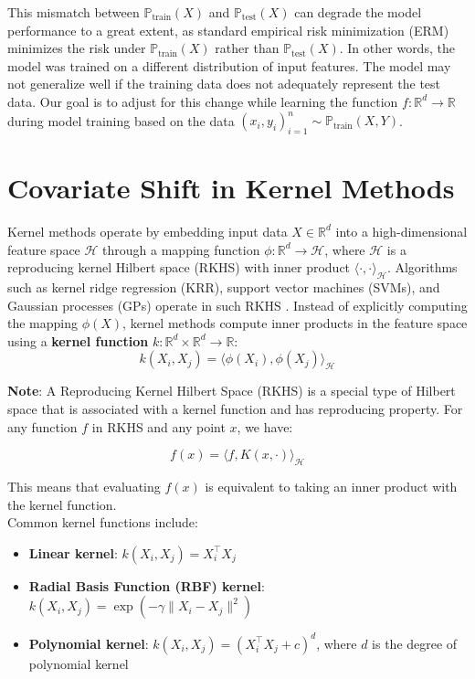 This mismatch between $\mathbb{P}_{\text{train}} (X)$ and $\mathbb{P}_{\text{test}} (X)$ can degrade the model performance to a great extent, as standard empirical risk minimization (ERM) minimizes the risk under $\mathbb{P}_{\text{train}} (X)$ rather than $\mathbb{P}_{\text{test}} (X)$. In other words, the model was trained on a different distribution of input features. The model may not generalize well if the training data does not adequately represent the test data. Our goal is to adjust for this change while learning the function $f: \mathbb{R}^d \rightarrow \mathbb{R}$ during model training based on the data ${(x_i, y_i)}_{i=1}^{n} \sim \mathbb{P}_{\text{train}}(X, Y)$.

\section{Covariate Shift in Kernel Methods}\label{kernel}

Kernel methods operate by embedding input data $X \in \mathbb{R}^d$ into a high-dimensional feature space $\mathcal{H}$ through a mapping function $\phi: \mathbb{R}^d \to \mathcal{H}$, where $\mathcal{H}$ is a reproducing kernel Hilbert space (RKHS) with inner product $\langle \cdot, \cdot \rangle_{\mathcal{H}}$. Algorithms such as kernel ridge regression (KRR), support vector machines (SVMs), and Gaussian processes (GPs) operate in such RKHS \citep{scholkopf2002learning}. Instead of explicitly computing the mapping $\phi(X)$, kernel methods compute inner products in the feature space using a \textbf{kernel function} $k: \mathbb{R}^d \times \mathbb{R}^d \to \mathbb{R}$:
$$k(X_i, X_j) = \langle \phi(X_i), \phi(X_j) \rangle_{\mathcal{H}}$$

\textbf{Note}: A Reproducing Kernel Hilbert Space (RKHS) is a special type of Hilbert space that is associated with a kernel function and has reproducing property. For any function $f$ in RKHS and any point $x$, we have:

$$f(x) = \langle f, K(x, \cdot) \rangle_{\mathcal{H}}$$

This means that evaluating $f(x)$ is equivalent to taking an inner product with the kernel function.\\

Common kernel functions include:
\begin{itemize}
    \item \textbf{Linear kernel}: $k(X_i, X_j) = X_i^\top X_j$
    \item \textbf{Radial Basis Function (RBF) kernel}: $k(X_i, X_j) = \exp (-\gamma \lVert X_i - X_j\rVert^2)$
    \item \textbf{Polynomial kernel}: $k(X_i, X_j) = (X_i^\top X_j + c)^d$, where $d$ is the degree of polynomial kernel
\end{itemize}

